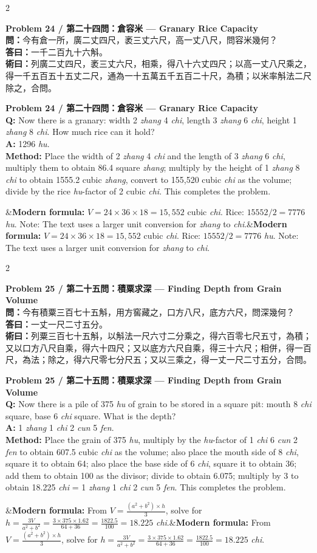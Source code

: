\documentclass[11pt,a4paper]{article}
\newcommand{\bilingualproblem}[4]{%
  \begin{paracol}{2}
  \begin{leftcolumn}
  \noindent\textbf{\color{problemcolor}#1}\\[0.2cm]
  #2
  \end{leftcolumn}
  \switchcolumn
  \noindent\textbf{\color{problemcolor}#1}\\[0.2cm]
  #3
  \end{paracol}
  \ifx&#4&\else\vspace{0.3cm}\noindent#4\fi
  \vspace{0.5cm}
}
\newcommand{\wen}[1]{\textcolor{problemcolor}{\textbf{問：}}#1}
\newcommand{\da}[1]{\textcolor{answercolor}{\textbf{答曰：}}#1}
\newcommand{\shu}[1]{\textcolor{methodcolor}{\textbf{術曰：}}#1}
\newcommand{\wenen}[1]{\textcolor{problemcolor}{\textbf{Q:}} #1}
\newcommand{\daen}[1]{\textcolor{answercolor}{\textbf{A:}} #1}
\newcommand{\shuen}[1]{\textcolor{methodcolor}{\textbf{Method:}} #1}
\begin{document}
\bilingualproblem{Problem 24 / 第二十四問：倉容米 --- Granary Rice Capacity}{
\wen{今有倉一所，廣二丈四尺，袤三丈六尺，高一丈八尺，問容米幾何？}\\[0.2cm]
\da{一千二百九十六斛。}\\[0.2cm]
\shu{列廣二丈四尺，袤三丈六尺，相乘，得八十六丈四尺；以高一丈八尺乘之，得一千五百五十五丈二尺，通為一十五萬五千五百二十尺，為積；以米率斛法二尺除之，合問。}
}{
\wenen{Now there is a granary: width 2 \textit{zhang} 4 \textit{chi}, length 3 \textit{zhang} 6 \textit{chi}, height 1 \textit{zhang} 8 \textit{chi}. How much rice can it hold?}\\[0.2cm]
\daen{1296 \textit{hu}.}\\[0.2cm]
\shuen{Place the width of 2 \textit{zhang} 4 \textit{chi} and the length of 3 \textit{zhang} 6 \textit{chi}, multiply them to obtain 86.4 square \textit{zhang}; multiply by the height of 1 \textit{zhang} 8 \textit{chi} to obtain 1555.2 cubic \textit{zhang}, convert to 155,520 cubic \textit{chi} as the volume; divide by the rice \textit{hu}-factor of 2 cubic \textit{chi}. This completes the problem.}
}{\textbf{Modern formula:} $V = 24 \times 36 \times 18 = 15,552$ cubic \textit{chi}. Rice: $15552 / 2 = 7776$ \textit{hu}. Note: The text uses a larger unit conversion for \textit{zhang} to \textit{chi}.}

\bilingualproblem{Problem 25 / 第二十五問：積粟求深 --- Finding Depth from Grain Volume}{
\wen{今有積粟三百七十五斛，用方窖藏之，口方八尺，底方六尺，問深幾何？}\\[0.2cm]
\da{一丈一尺二寸五分。}\\[0.2cm]
\shu{列粟三百七十五斛，以斛法一尺六寸二分乘之，得六百零七尺五寸，為積；又以口方八尺自乘，得六十四尺；又以底方六尺自乘，得三十六尺；相併，得一百尺，為法；除之，得六尺零七分尺五；又以三乘之，得一丈一尺二寸五分，合問。}
}{
\wenen{Now there is a pile of 375 \textit{hu} of grain to be stored in a square pit: mouth 8 \textit{chi} square, base 6 \textit{chi} square. What is the depth?}\\[0.2cm]
\daen{1 \textit{zhang} 1 \textit{chi} 2 \textit{cun} 5 \textit{fen}.}\\[0.2cm]
\shuen{Place the grain of 375 \textit{hu}, multiply by the \textit{hu}-factor of 1 \textit{chi} 6 \textit{cun} 2 \textit{fen} to obtain 607.5 cubic \textit{chi} as the volume; also place the mouth side of 8 \textit{chi}, square it to obtain 64; also place the base side of 6 \textit{chi}, square it to obtain 36; add them to obtain 100 as the divisor; divide to obtain 6.075; multiply by 3 to obtain 18.225 \textit{chi} = 1 \textit{zhang} 1 \textit{chi} 2 \textit{cun} 5 \textit{fen}. This completes the problem.}
}{\textbf{Modern formula:} From $V = \frac{(a^2 + b^2) \times h}{3}$, solve for $h = \frac{3V}{a^2 + b^2} = \frac{3 \times 375 \times 1.62}{64+36} = \frac{1822.5}{100} = 18.225$ \textit{chi}.}
\end{document}

